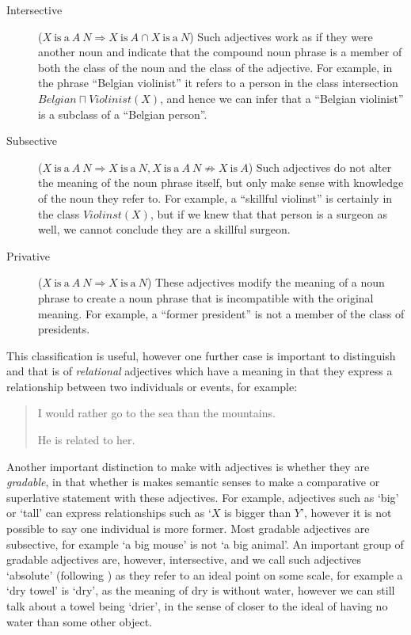 \documentclass[11pt]{article}
\begin{document}
\begin{description}
\item[Intersective] ($X\mathrm{~is~a~}A~N \Rightarrow X\mathrm{~is~}A \cap X\mathrm{~is~a~}N$) Such adjectives work as if they were another noun and indicate that the compound noun phrase is a member of both the class of the noun and the class of the adjective. For example, in the phrase ``Belgian violinist'' it refers to a person in the class intersection $Belgian \sqcap Violinist(X)$, and hence we can infer that a ``Belgian violinist'' is a subclass of a ``Belgian person''.
\item[Subsective] ($X\mathrm{~is~a~}A~N \Rightarrow X\mathrm{~is~a~}N, X\mathrm{~is~a~}A~N \not\Rightarrow X\mathrm{~is~}A$) Such adjectives do not alter the meaning of the noun phrase itself, but only make sense with knowledge of the noun they refer to. For example, a ``skillful violinst'' is certainly in the class $Violinst(X)$, but if we knew that that person is a surgeon as well, we cannot conclude they are a skillful surgeon.
\item[Privative] ($X\mathrm{~is~a~}A~N \Rightarrow X\mathrm{~is~a~}N$) These adjectives modify the meaning of a noun phrase to create a noun phrase that is incompatible with the original meaning. For example, a ``former president'' is not a member of the class of presidents.
\end{description}

This classification is useful, however one further case is important to distinguish and that is of \emph{relational} adjectives which have a meaning in that they express a relationship between two individuals or events, for example:

\begin{quote}
I would rather go to the sea than the mountains.

He is related to her.
\end{quote}

Another important distinction to make with adjectives is whether they are \emph{gradable}, in that whether is makes semantic senses to make a comparative or superlative statement with these adjectives. For example, adjectives such as `big' or `tall' can express relationships such as `$X$ is bigger than $Y$', however it is not possible to say one individual is more former. Most gradable adjectives are subsective, for example `a big mouse' is not `a big animal'. An important group of gradable adjectives are, however, intersective, and we call such adjectives `absolute' (following \cite{rusiecki}) as they refer to an ideal point on some scale, for example a `dry towel' is `dry', as the meaning of dry is without water, however we can still talk about a towel being `drier', in the sense of closer to the ideal of having no water than some other object.
\end{document}
